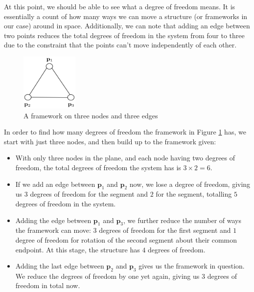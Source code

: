 \begin{flushleft}
At this point, we should be able to see what a degree of freedom means. It is essentially a count of how many ways we can move a structure (or frameworks in our case) around in space. Additionally, we can note that adding an edge between two points reduces the total degrees of freedom in the system from four to three due to the constraint that the points can't move independently of each other. 
\end{flushleft}
\vspace{-3 mm}
\begin{figure}[htbp]
    \centering
    \includegraphics[width = 0.25\textwidth]{Chapter 3/5. degree_of_freedom.png}
    \caption{A framework on three nodes and three edges}
    \label{fig: degree_of_freedom}
\end{figure}

\begin{example}
In order to find how many degrees of freedom the framework in Figure \ref{fig: degree_of_freedom} has, we start with just three nodes, and then build up to the framework given:
\begin{itemize}
    \item With only three nodes in the plane, and each node having two degrees of freedom, the total degrees of freedom the system has is $3 \times 2 = 6$.
    \item If we add an edge between $\mathbf{p}_1$ and $\mathbf{p}_2$ now, we lose a degree of freedom, giving us $3$ degrees of freedom for the segment and $2$ for the segment, totalling $5$ degrees of freedom in the system.
    \item Adding the edge between $\mathbf{p}_1$ and $\mathbf{p}_3$, we further reduce the number of ways the framework can move: $3$ degrees of freedom for the first segment and $1$ degree of freedom for rotation of the second segment about their common endpoint. At this stage, the structure has $4$ degrees of freedom.
    \item Adding the last edge between $\mathbf{p}_2$ and $\mathbf{p}_3$ gives us the framework in question. We reduce the degrees of freedom by one yet again, giving us $3$ degrees of freedom in total now.
\end{itemize}
\end{example}

